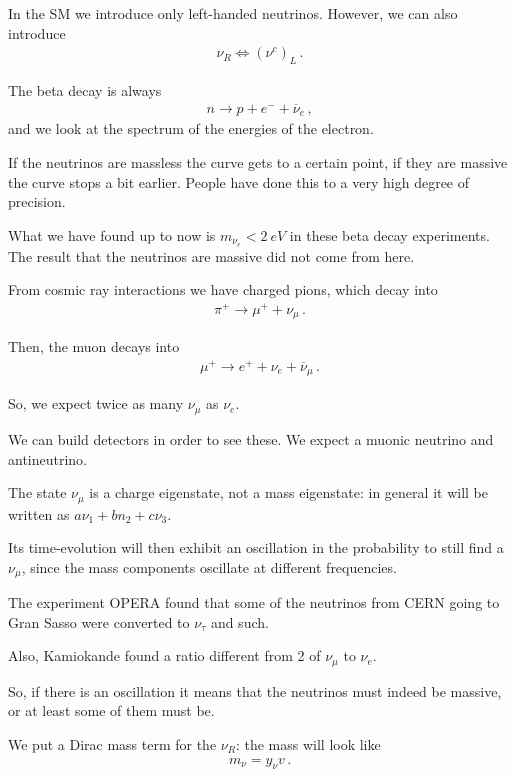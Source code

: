 \documentclass[main.tex]{subfiles}
\begin{document}
In the SM we introduce only left-handed neutrinos. However, we can also introduce 
%
\begin{align}
\nu_{R} \iff (\nu^{c})_{L}
\,.
\end{align}

The beta decay is always 
%
\begin{align}
n \to p + e^{-} + \overline{\nu}_{e}
\,,
\end{align}
%
and we look at the spectrum of the energies of the electron. 

If the neutrinos are massless the curve gets to a certain point, if they are massive the curve stops a bit earlier. 
People have done this to a very high degree of precision.

What we have found up to now is \(m_{\nu_{e}} < \SI{2}{eV}\) in these beta decay experiments. 
The result that the neutrinos are massive did not come from here. 

From cosmic ray interactions we have charged pions, which decay into 
%
\begin{align}
\pi^{+} \to \mu^+ + \nu_{\mu }
\,.
\end{align}

Then, the muon decays into 
%
\begin{align}
\mu^+ \to e^{+} + \nu_{e} + \overline{\nu}_{\mu }
\,.
\end{align}

So, we expect twice as many \(\nu_{\mu }\) as \(\nu_{e}\).

We can build detectors in order to see these. We expect a muonic neutrino and antineutrino. 

The state \(\nu_{\mu }\) is a charge eigenstate, not a mass eigenstate: in general it will be written as \(a \nu_1 + b n_2 +c \nu_3 \).

Its time-evolution will then exhibit an oscillation in the probability to still find a \(\nu_{\mu }\), since the mass components oscillate at different frequencies.

The experiment OPERA found that some of the neutrinos from CERN going to Gran Sasso were converted to \(\nu_{\tau }\) and such. 

Also, Kamiokande found a ratio different from 2 of \(\nu_{\mu }\) to \(\nu_{e}\).

So, if there is an oscillation it means that the neutrinos must indeed be massive, or at least some of them must be.

We put a Dirac mass term for the \(\nu_{R}\): the mass will look like 
%
\begin{align}
m_{\nu } =  y_{\nu } v
\,.
\end{align}
\end{document}
